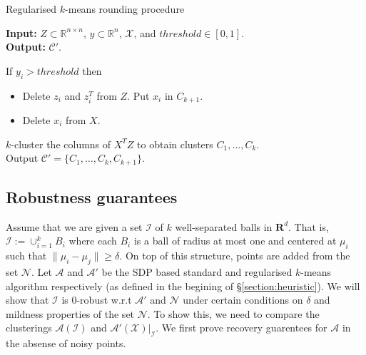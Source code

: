 \documentclass[12pt]{article}
\newcommand{\mc}{\mathcal}
\newcommand{\mb}{\mathbf}
\begin{document}
\begin{algorithm}[t]
\caption{Regularised $k$-means rounding procedure}
\label{alg:roundSDP}
	\textbf{Input: }{ $Z \subset \mathbb{R}^{n\times n}$, $y \subset \mathbb{R}^{n}$, $\mc{X}$, and $threshold \in [0,1]$.}\\
	\textbf{Output: }{$\mc C'$.}
	
	If $y_i > threshold$ then
	\begin{itemize}[nolistsep] 
		\item[] Delete $z_i$ and $z_i^T$ from $Z$. Put $x_i$ in $C_{k+1}$.
		\item[] Delete $x_i$ from $X$.
	\end{itemize}
	$k$-cluster the columns of $X^TZ$ to obtain clusters $C_1, \ldots, C_k$.\\
	Output $\mc C' = \{C_1, \ldots, C_k, C_{k+1}\}$.
\end{algorithm}

\subsection{Robustness guarantees}
\label{subsection:sdpRobust}

Assume that we are given a set $\mc I$ of $k$ well-separated balls in $\mb R^d$. That is, $\mc I := \cup_{i=1}^k B_i$ where each $B_i$ is a ball of radius at most one and centered at $\mu_i$ such that $\|\mu_i - \mu_j\| \ge \delta$. On top of this structure, points are added from the set $\mc N$. Let $\mc A$ and $\mc A'$ be the SDP based standard and regularised $k$-means algorithm respectively (as defined in the begining of \S \ref{section:heuristic}). We will show that $\mc I$ is $0$-robust w.r.t $\mc A'$ and $\mc N$ under certain conditions on $\delta$ and mildness properties of the set $\mc N$. To show this, we need to compare the clusterings $\mc A(\mc I)$ and $\mc A'(\mc X)|_{\mc I}$. We first prove recovery guarentees for $\mc A$ in the absense of noisy points.
\end{document}
